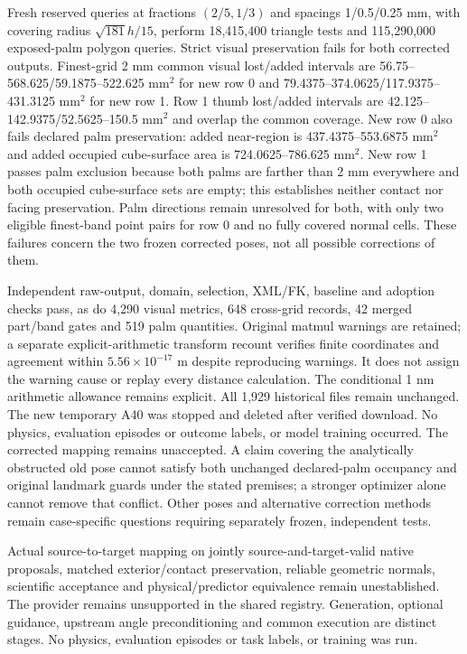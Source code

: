 \documentclass[10pt,letterpaper]{article}
\begin{document}
Fresh reserved queries at fractions $(2/5,1/3)$ and spacings 1/0.5/0.25 mm,
with covering radius $\sqrt{181}h/15$, perform 18,415,400 triangle tests and
115,290,000 exposed-palm polygon queries. Strict visual preservation fails for
both corrected outputs. Finest-grid 2 mm common visual lost/added intervals
are 56.75--568.625/59.1875--522.625 mm$^2$ for new row 0 and
79.4375--374.0625/117.9375--431.3125 mm$^2$ for new row 1. Row 1 thumb
lost/added intervals are 42.125--142.9375/52.5625--150.5 mm$^2$ and overlap
the common coverage. New row 0 also fails declared palm preservation:
added near-region is 437.4375--553.6875 mm$^2$ and added occupied cube-surface
area is 724.0625--786.625 mm$^2$. New row 1 passes palm exclusion because both
palms are farther than 2 mm everywhere and both occupied cube-surface sets are empty;
this establishes neither contact nor facing preservation. Palm directions
remain unresolved for both, with only two eligible finest-band point pairs
for row 0 and no fully covered normal cells. These failures concern the two
frozen corrected poses, not all possible corrections of them.

Independent raw-output, domain, selection, XML/FK, baseline and adoption checks
pass, as do 4,290 visual metrics, 648 cross-grid records, 42 merged part/band
gates and 519 palm quantities. Original matmul warnings are retained; a separate
explicit-arithmetic transform recount verifies finite coordinates and agreement
within $5.56\times10^{-17}$ m despite reproducing warnings. It does not assign
the warning cause or replay every distance calculation. The conditional 1 nm
arithmetic allowance remains explicit. All 1,929 historical files remain
unchanged. The new temporary A40 was stopped and deleted after verified download.
No physics, evaluation episodes or outcome labels, or model training occurred.
The corrected mapping remains unaccepted. A claim covering the analytically
obstructed old pose cannot satisfy both unchanged declared-palm occupancy and
original landmark guards under the stated premises; a stronger optimizer alone
cannot remove that conflict. Other poses and alternative correction methods
remain case-specific questions requiring separately frozen, independent tests.


Actual source-to-target mapping on jointly source-and-target-valid native
proposals, matched exterior/contact preservation, reliable geometric normals, scientific acceptance
and physical/predictor equivalence remain unestablished. The provider remains
unsupported in the shared registry. Generation, optional guidance, upstream angle
preconditioning and common execution are distinct stages. No physics, evaluation
episodes or task labels, or training was run.
\end{document}
